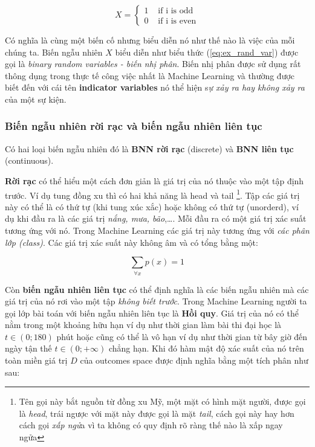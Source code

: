 \documentclass[../main-report.tex]{subfiles}
\begin{document}
\begin{equation} \label{eq:ex_rand_var}
X = \left\{\begin{array}{ll}
	1 & \text{ if i is odd} \\
	0 & \text{ if i is even}
	\end{array}\right.
\end{equation}

Có nghĩa là cùng một biến cố nhưng biểu diễn nó như thế nào là việc của mỗi chúng ta. Biến ngẫu nhiên $X$ biểu diễn như biểu thức (\ref{eq:ex_rand_var}) được gọi là \textit{binary random variables - biến nhị phân}. Biến nhị phân được sử dụng rất thông dụng trong thực tế công việc nhất là Machine Learning và thường được biết đến với cái tên \textbf{indicator variables} nó thể hiện s\textit{ự xảy ra hay không xảy ra} của một sự kiện.

\subsubsection*{Biến ngẫu nhiên rời rạc và biến ngẫu nhiên liên tục}
Có hai loại biến ngẫu nhiên đó là \textbf{BNN rời rạc} (discrete) và \textbf{BNN liên tục} (continuous).

\textbf{Rời rạc} có thể hiểu một cách đơn giản là giá trị của nó thuộc vào một tập định trước. 
Ví dụ tung đồng xu thì có hai khả năng là head và tail \footnote{Tên gọi này bắt nguồn từ đồng xu Mỹ, một mặt có hình mặt người, được gọi là \textit{head}, trái ngược với mặt này được gọi là mặt \textit{tail}, cách gọi này hay hơn cách gọi \textit{xấp ngử}a vì ta không có quy định rõ ràng thế nào là xấp ngay ngửa}. Tập các giá trị này có thể là có thứ tự (khi tung xúc xắc) hoặc không có thứ tự (unorderd), ví dụ khi đầu ra là các giá trị \textit{nắng, mưa, bão},\ldots. Mỗi đầu ra có một giá trị xác suất tương ứng với nó. Trong Machine Learning các giá trị này tương ứng với \textit{các phân lớp (class)}. Các giá trị xác suất này không âm và có tổng bằng một:

\begin{equation}
\sum_{\forall x}{p(x)}=1 
\end{equation}

Còn \textbf{biến ngẫu nhiên liên tục} có thể định nghĩa là các biến ngẫu nhiên mà các giá trị của nó rơi vào một tập \textit{không biết trước}. Trong Machine Learning người ta gọi lớp bài toán với biến ngẫu nhiên liên tục là \textbf{Hồi quy}. Giá trị của nó có thể nằm trong một khoảng hữu hạn ví dụ như thời gian làm bài thi đại học là $t \in \left ( 0;180 \right )$ phút hoặc cũng có thể là vô hạn ví dụ như thời gian từ bây giờ đến ngày tận thế $t \in \left ( 0; +\infty \right )$ chẳng hạn. Khi đó hàm mật độ xác suất của nó trên toàn miền giá trị $D$ của outcomes space được định nghĩa bằng một tích phân như sau:
\end{document}
